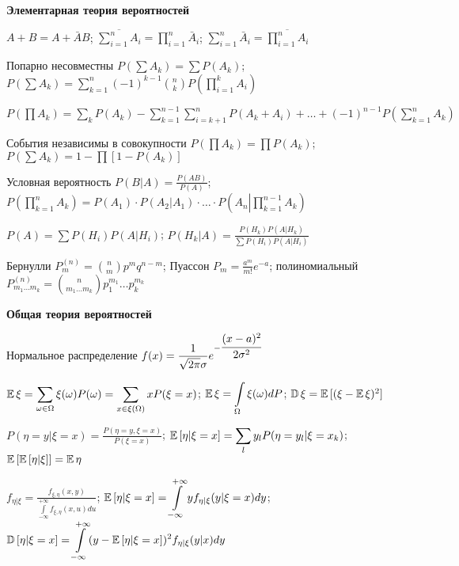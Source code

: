 \begin{center}
    \textbf{Элементарная теория вероятностей}
\end{center}

$\displaystyle A + B = A + \bar{A}B$;
$\displaystyle \overline{\sum_{i=1}^{n}A_i} = \prod_{i=1}^{n}\bar{A}_i$;
$\displaystyle \sum_{i=1}^{n}\bar{A}_i = \overline{\prod_{i=1}^{n}A_i}$

Попарно несовместны
$\displaystyle P(\sum{A_k}) = \sum{P(A_k)}$;
$\displaystyle P(\sum A_k) = \sum_{k=1}^n (-1)^{k-1}\binom{n}{k}P(\prod_{i=1}^k A_i)$

$\displaystyle P(\prod A_k) = \sum_k P(A_k) - \sum_{k=1}^{n-1}\sum_{i=k+1}^n P(A_k + A_i) +\ldots + (-1)^{n-1}P(\sum_{k=1}^n A_k)$

События независимы в совокупности
$\displaystyle P(\prod A_k) = \prod{P(A_k)}$;
$\displaystyle P(\sum{A_k}) = 1-\prod[1-P(A_k)]$

Условная вероятность
$\displaystyle P(B|A) = \frac{P(AB)}{P(A)}$;
$\displaystyle P\left(\prod_{k=1}^{n}A_k\right) = P(A_1)\cdot P(A_2|A_1)\cdot\ldots\cdot P\left(A_n\left|\right.\prod_{k=1}^{n-1}A_k\right)$

$\displaystyle P(A) = \sum P(H_i)P(A|H_i)$;
$\displaystyle P(H_k|A) = \frac{P(H_k)P(A|H_k)}{\sum P(H_i)P(A|H_i)}$

Бернулли
$\displaystyle P^{(n)}_m = \binom{n}{m}p^mq^{n-m}$;
Пуассон
$\displaystyle P_m = \frac{a^m}{m!}e^{-a}$;
полиномиальный
$\displaystyle P^{(n)}_{m_1\ldots m_k} = \binom{n}{m_1\ldots m_k}p_1^{m_1}\ldots p_k^{m_k}$


\begin{center}
    \textbf{Общая теория вероятностей}
\end{center}

Нормальное распределение
$\displaystyle f(x) = \frac{1}{\sqrt{2\pi}\sigma}e^{-\cfrac{(x-a)^2}{2\sigma^2}}$

$\displaystyle \operatorname{\mathbb{E}}{\xi} =
\sum_{\omega\in\Omega}\xi(\omega)P(\omega) =
\sum_{x\in\xi(\Omega)}xP(\xi=x)$;
$\displaystyle \operatorname{\mathbb{E}}{\xi} = \int\limits_\Omega\xi(\omega)dP$;
$\operatorname{\mathbb{D}}{\xi} = \operatorname{\mathbb{E}}{[(\xi - \operatorname{\mathbb{E}}{\xi})^2]}$

$\displaystyle P(\eta = y | \xi = x) = \frac{P(\eta = y, \xi = x)}{P(\xi = x)}$;
$\displaystyle \operatorname{\mathbb{E}}{[\eta | \xi=x]} = \sum_ly_lP(\eta=y_l|\xi=x_k)$;
$\operatorname{\mathbb{E}}{[\operatorname{\mathbb{E}}{[\eta|\xi]}]} = \operatorname{\mathbb{E}}{\eta}$

$\displaystyle f_{\eta|\xi} =
\frac{f_{\xi,\eta}(x,y)}{\int\limits_{-\infty}^{+\infty}f_{\xi,\eta}(x,u)du}$;
$\displaystyle \operatorname{\mathbb{E}}{[\eta | \xi=x]} =
\int\limits_{-\infty}^{+\infty}yf_{\eta|\xi}(y|\xi=x)dy$;
$\displaystyle \operatorname{\mathbb{D}}{[\eta|\xi=x]} =
\int\limits_{-\infty}^{+\infty}(y-\operatorname{\mathbb{E}}{[\eta|\xi=x]})^2f_{\eta|\xi}(y|x)dy$

